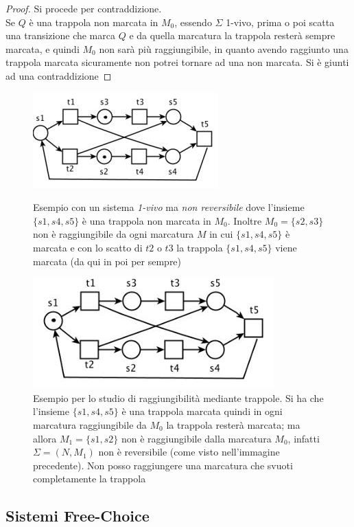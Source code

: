 \documentclass[a4paper,12pt, oneside]{book}
\begin{document}
\begin{proof}
  Si procede per contraddizione.\\
  Se $Q$ è una trappola non marcata in $M_0$, essendo $\Sigma$ 1-vivo, prima o
  poi scatta una transizione che marca $Q$ e da quella marcatura la
  trappola resterà sempre marcata, e quindi $M_0$ non sarà più raggiungibile, in
  quanto avendo raggiunto una trappola marcata sicuramente non potrei tornare ad
  una non marcata. Si è giunti ad una contraddizione
\end{proof}
\begin{figure}[H]
  \centering
  \includegraphics[scale = 0.55]{img/tr.jpg}
  \caption{Esempio con un sistema \emph{1-vivo} ma \emph{non reversibile} dove
    l'insieme $\{s1,s4,s5\}$ è una trappola non marcata in $M_0$. Inoltre
    $M_0=\{s2,s3\}$ non è raggiungibile da ogni marcatura $M$ in cui
    $\{s1,s4,s5\}$ è marcata e con lo scatto di $t2$ o $t3$ la trappola
    $\{s1,s4,s5\}$ viene marcata (da qui in poi per sempre)}
  \includegraphics[scale = 0.55]{img/tr2.jpg}
  \caption{Esempio per lo studio di raggiungibilità mediante trappole. Si ha che
    l'insieme $\{s1,s4,s5\}$ è una trappola marcata quindi in ogni marcatura
    raggiungibile da $M_0$ la trappola resterà marcata; ma allora $M_1=\{s1,s2\}$
    non è raggiungibile dalla marcatura $M_0$, infatti $\Sigma=(N,M_1)$ non è
    reversibile (come visto nell'immagine precedente). Non posso raggiungere una
    marcatura che svuoti completamente la trappola}  
\end{figure}
\subsection{Sistemi Free-Choice}
\end{document}
